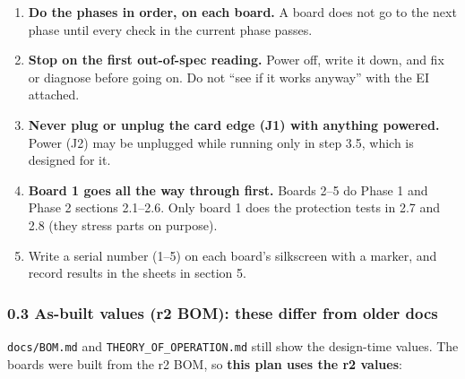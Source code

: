 \documentclass[
  10pt,
  twoside]{article}
\providecommand{\tightlist}{%
  \setlength{\itemsep}{0pt}\setlength{\parskip}{0pt}}
\begin{document}
\begin{enumerate}
\def\labelenumi{\arabic{enumi}.}
\tightlist
\item
  \textbf{Do the phases in order, on each board.} A board
  does not go to the next phase until every check in the
  current phase passes.
\item
  \textbf{Stop on the first out-of-spec reading.} Power off,
  write it down, and fix or diagnose before going on. Do not
  ``see if it works anyway'' with the EI attached.
\item
  \textbf{Never plug or unplug the card edge (J1) with
  anything powered.} Power (J2) may be unplugged while
  running only in step 3.5, which is designed for it.
\item
  \textbf{Board 1 goes all the way through first.} Boards
  2--5 do Phase 1 and Phase 2 sections 2.1--2.6. Only board
  1 does the protection tests in 2.7 and 2.8 (they stress
  parts on purpose).
\item
  Write a serial number (1--5) on each board's silkscreen
  with a marker, and record results in the sheets in section
  5.
\end{enumerate}

\hypertarget{as-built-values-r2-bom-these-differ-from-older-docs}{%
\subsubsection{0.3 As-built values (r2 BOM): these differ
from older
docs}\label{as-built-values-r2-bom-these-differ-from-older-docs}}

\texttt{docs/BOM.md} and \texttt{THEORY\_OF\_OPERATION.md}
still show the design-time values. The boards were built
from the r2 BOM, so \textbf{this plan uses the r2 values}:
\end{document}
